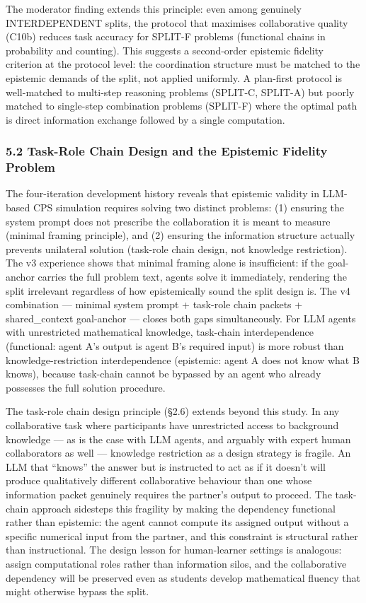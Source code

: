 \documentclass[
  11pt,
]{article}
\begin{document}
The moderator finding extends this principle: even among genuinely INTERDEPENDENT splits, the protocol that maximises collaborative quality (C10b) reduces task accuracy for SPLIT-F problems (functional chains in probability and counting). This suggests a second-order epistemic fidelity criterion at the protocol level: the coordination structure must be matched to the epistemic demands of the split, not applied uniformly. A plan-first protocol is well-matched to multi-step reasoning problems (SPLIT-C, SPLIT-A) but poorly matched to single-step combination problems (SPLIT-F) where the optimal path is direct information exchange followed by a single computation.

\subsubsection{5.2 Task-Role Chain Design and the Epistemic Fidelity
Problem}\label{task-role-chain-design-and-the-epistemic-fidelity-problem-1}

The four-iteration development history reveals that epistemic validity
in LLM-based CPS simulation requires solving two distinct problems: (1)
ensuring the system prompt does not prescribe the collaboration it is
meant to measure (minimal framing principle), and (2) ensuring the
information structure actually prevents unilateral solution (task-role
chain design, not knowledge restriction). The v3 experience shows that
minimal framing alone is insufficient: if the goal-anchor carries the
full problem text, agents solve it immediately, rendering the split
irrelevant regardless of how epistemically sound the split design is.
The v4 combination --- minimal system prompt + task-role chain packets +
shared\_context goal-anchor --- closes both gaps simultaneously. For LLM
agents with unrestricted mathematical knowledge, task-chain
interdependence (functional: agent A's output is agent B's required
input) is more robust than knowledge-restriction interdependence
(epistemic: agent A does not know what B knows), because task-chain
cannot be bypassed by an agent who already possesses the full solution
procedure.

The task-role chain design principle (§2.6) extends beyond this study. In any collaborative task where participants have unrestricted access to background knowledge --- as is the case with LLM agents, and arguably with expert human collaborators as well --- knowledge restriction as a design strategy is fragile. An LLM that ``knows'' the answer but is instructed to act as if it doesn't will produce qualitatively different collaborative behaviour than one whose information packet genuinely requires the partner's output to proceed. The task-chain approach sidesteps this fragility by making the dependency functional rather than epistemic: the agent cannot compute its assigned output without a specific numerical input from the partner, and this constraint is structural rather than instructional. The design lesson for human-learner settings is analogous: assign computational roles rather than information silos, and the collaborative dependency will be preserved even as students develop mathematical fluency that might otherwise bypass the split.
\end{document}
